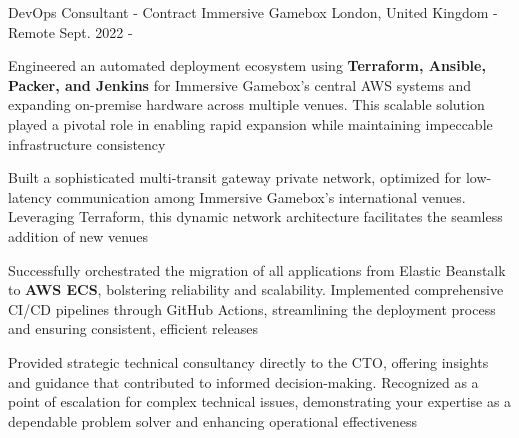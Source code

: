 
\begin{cventries}


  \cventry
    {DevOps Consultant - Contract} %
    {Immersive Gamebox} %
    {London, United Kingdom - Remote} %
    {Sept. 2022 - } %
    {
      \begin{cvitems} %
        \item {Engineered an automated deployment ecosystem using \textbf{Terraform, Ansible, Packer, and Jenkins} for Immersive Gamebox's central AWS systems and expanding on-premise hardware across multiple venues. This scalable solution played a pivotal role in enabling rapid expansion while maintaining impeccable infrastructure consistency}
        \item {Built a sophisticated multi-transit gateway private network, optimized for low-latency communication among Immersive Gamebox's international venues. Leveraging Terraform, this dynamic network architecture facilitates the seamless addition of new venues}
        \item {Successfully orchestrated the migration of all applications from Elastic Beanstalk to \textbf{AWS ECS}, bolstering reliability and scalability. Implemented comprehensive CI/CD pipelines through GitHub Actions, streamlining the deployment process and ensuring consistent, efficient releases}
        \item {Provided strategic technical consultancy directly to the CTO, offering insights and guidance that contributed to informed decision-making. Recognized as a point of escalation for complex technical issues, demonstrating your expertise as a dependable problem solver and enhancing operational effectiveness}
      \end{cvitems}
    }


\end{cventries}
